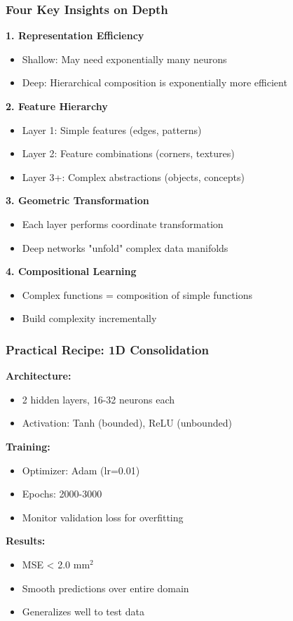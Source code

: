 \documentclass[notes]{beamer}
\begin{document}
\begin{frame}
\frametitle{Four Key Insights on Depth}

\textbf{1. Representation Efficiency}
\begin{itemize}
\item Shallow: May need exponentially many neurons
\item Deep: Hierarchical composition is exponentially more efficient
\end{itemize}

\textbf{2. Feature Hierarchy}
\begin{itemize}
\item Layer 1: Simple features (edges, patterns)
\item Layer 2: Feature combinations (corners, textures)
\item Layer 3+: Complex abstractions (objects, concepts)
\end{itemize}

\textbf{3. Geometric Transformation}
\begin{itemize}
\item Each layer performs coordinate transformation
\item Deep networks "unfold" complex data manifolds
\end{itemize}

\textbf{4. Compositional Learning}
\begin{itemize}
\item Complex functions = composition of simple functions
\item Build complexity incrementally
\end{itemize}

\end{frame}

\begin{frame}
\frametitle{Practical Recipe: 1D Consolidation}

\textbf{Architecture:}
\begin{itemize}
\item 2 hidden layers, 16-32 neurons each
\item Activation: Tanh (bounded), ReLU (unbounded)
\end{itemize}

\textbf{Training:}
\begin{itemize}
\item Optimizer: Adam (lr=0.01)
\item Epochs: 2000-3000
\item Monitor validation loss for overfitting
\end{itemize}

\textbf{Results:}
\begin{itemize}
\item MSE < 2.0 mm$^2$
\item Smooth predictions over entire domain
\item Generalizes well to test data
\end{itemize}

\end{frame}
\end{document}
